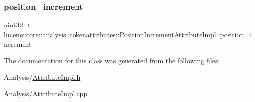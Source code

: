 \subsubsection{\texorpdfstring{position\+\_\+increment}{position\_increment}}
{\footnotesize\ttfamily uint32\+\_\+t lucene\+::core\+::analysis\+::tokenattributes\+::\+Position\+Increment\+Attribute\+Impl\+::position\+\_\+increment\hspace{0.3cm}{\ttfamily [private]}}



The documentation for this class was generated from the following files\+:\begin{DoxyCompactItemize}
\item 
Analysis/\mbox{\hyperlink{AttributeImpl_8h}{Attribute\+Impl.\+h}}\item 
Analysis/\mbox{\hyperlink{AttributeImpl_8cpp}{Attribute\+Impl.\+cpp}}\end{DoxyCompactItemize}
